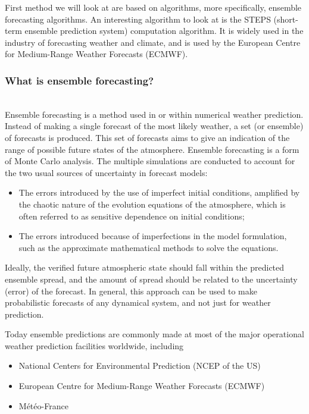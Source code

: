 \documentclass[../paper.tex]{subfiles}
\begin{document}
    First method we will look at are based on algorithms, more specifically, ensemble forecasting algorithms.
    An interesting algorithm to look at is the STEPS (short-term ensemble prediction system) computation algorithm.
    It is widely used in the industry of forecasting weather and climate, and is used by the European Centre for Medium-Range Weather Forecasts (ECMWF)\cite{a1, b4}. \\
    \subsubsection{What is ensemble forecasting?}
        \hfill\\
        Ensemble forecasting is a method used in or within numerical weather prediction.
        Instead of making a single forecast of the most likely weather, a set (or ensemble) of forecasts is produced.
        This set of forecasts aims to give an indication of the range of possible future states of the atmosphere.
        Ensemble forecasting is a form of Monte Carlo analysis.
        The multiple simulations are conducted to account for the two usual sources of uncertainty in forecast models:
        \begin{itemize}
            \item The errors introduced by the use of imperfect initial conditions, amplified by the chaotic nature of the evolution equations of the atmosphere, which is often referred to as sensitive dependence on initial conditions;
            \item The errors introduced because of imperfections in the model formulation, such as the approximate mathematical methods to solve the equations.
        \end{itemize}
        Ideally, the verified future atmospheric state should fall within the predicted ensemble spread,
        and the amount of spread should be related to the uncertainty (error) of the forecast.
        In general, this approach can be used to make probabilistic forecasts of any dynamical system,
        and not just for weather prediction\cite{a1}.

        Today ensemble predictions are commonly made at most of the major operational weather prediction facilities worldwide,
        including
        \begin{itemize}
            \item National Centers for Environmental Prediction (NCEP of the US)
            \item European Centre for Medium-Range Weather Forecasts (ECMWF)
            \item M\'et\'eo-France
        \end{itemize}\cite{a1}
\end{document}
